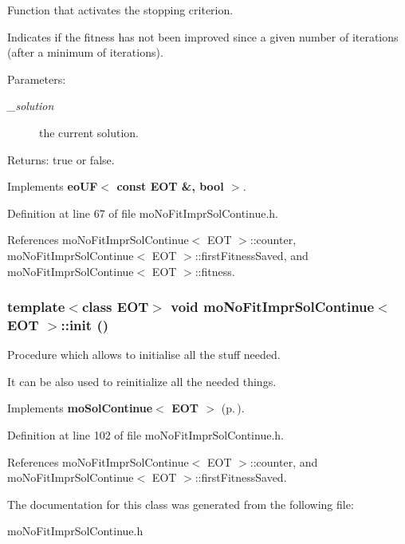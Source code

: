 Function that activates the stopping criterion. 

Indicates if the fitness has not been improved since a given number of iterations (after a minimum of iterations). \begin{Desc}
\item[Parameters:]
\begin{description}
\item[{\em \_\-solution}]the current solution. \end{description}
\end{Desc}
\begin{Desc}
\item[Returns:]true or false. \end{Desc}


Implements {\bf eo\-UF$<$ const EOT \&, bool $>$}.

Definition at line 67 of file mo\-No\-Fit\-Impr\-Sol\-Continue.h.

References mo\-No\-Fit\-Impr\-Sol\-Continue$<$ EOT $>$::counter, mo\-No\-Fit\-Impr\-Sol\-Continue$<$ EOT $>$::first\-Fitness\-Saved, and mo\-No\-Fit\-Impr\-Sol\-Continue$<$ EOT $>$::fitness.
\subsubsection{\setlength{\rightskip}{0pt plus 5cm}template$<$class EOT$>$ void {\bf mo\-No\-Fit\-Impr\-Sol\-Continue}$<$ EOT $>$::init ()\hspace{0.3cm}{\tt  [inline, virtual]}}\label{classmo_no_fit_impr_sol_continue_a2}


Procedure which allows to initialise all the stuff needed. 

It can be also used to reinitialize all the needed things. 

Implements {\bf mo\-Sol\-Continue$<$ EOT $>$} {\rm (p.\,\pageref{classmo_sol_continue_a0})}.

Definition at line 102 of file mo\-No\-Fit\-Impr\-Sol\-Continue.h.

References mo\-No\-Fit\-Impr\-Sol\-Continue$<$ EOT $>$::counter, and mo\-No\-Fit\-Impr\-Sol\-Continue$<$ EOT $>$::first\-Fitness\-Saved.

The documentation for this class was generated from the following file:\begin{CompactItemize}
\item 
mo\-No\-Fit\-Impr\-Sol\-Continue.h\end{CompactItemize}
